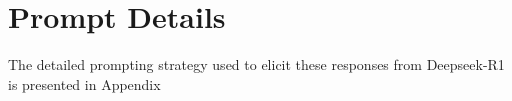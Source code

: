 \section{Prompt Details}
\label{app:prompt}
The detailed prompting strategy used to elicit these responses from Deepseek-R1 is presented in Appendix

